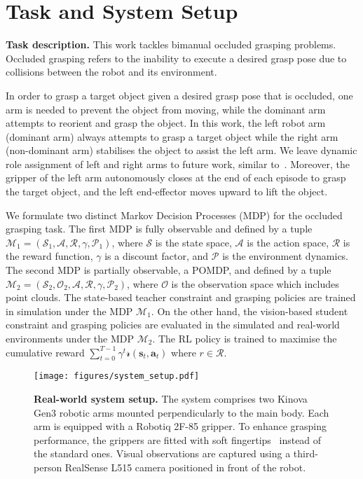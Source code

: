 \section{Task and System Setup}
\textbf{Task description.} 
\label{sec:task_desc}
This work tackles bimanual occluded grasping problems.
Occluded grasping refers to the inability to execute a desired grasp pose due to collisions between the robot and its environment. 


In order to grasp a target object given a desired grasp pose that is occluded, one arm is needed to prevent the object from moving, while the dominant arm attempts to reorient and grasp the object.
In this work, the left robot arm (dominant arm) always attempts to grasp a target object while the right arm (non-dominant arm) stabilises the object to assist the left arm.
We leave dynamic role assignment of left and right arms to future work, similar to~\cite{grannen2023stabilize}.
Moreover, the gripper of the left arm autonomously closes at the end of each episode to grasp the target object, and the left end-effector moves upward to lift the object.

We formulate two distinct Markov Decision Processes (MDP) for the occluded grasping task.
The first MDP is fully observable and defined by a tuple $\mathcal{M}_{1} = (\mathcal{S}_{1}, \mathcal{A}, \mathcal{R}, \gamma, \mathcal{P}_{1})$, where $\mathcal{S}$ is the state space, $\mathcal{A}$ is the action space, $\mathcal{R}$ is the reward function, $\gamma$ is a discount factor, and $\mathcal{P}$ is the environment dynamics.
The second MDP is partially observable, a POMDP, and defined by a tuple $\mathcal{M}_{2} = (\mathcal{S}_{2}, \mathcal{O}_{2}, \mathcal{A}, \mathcal{R}, \gamma, \mathcal{P}_{2})$, where $\mathcal{O}$ is the observation space which includes point clouds.
The state-based teacher constraint and grasping policies are trained in simulation under the MDP $\mathcal{M}_{1}$.
On the other hand, the vision-based student constraint and grasping policies are evaluated in the simulated and real-world environments under the MDP $\mathcal{M}_{2}$.
The RL policy is trained to maximise the cumulative reward $\sum_{t=0}^{T-1}\gamma^{t} \mathcal{r}(\mathbf{s}_{t}, \mathbf{a}_{t})$ where $r \in \mathcal{R}$.

\begin{figure}
    \centering
    \texttt{[image: figures/system\_setup.pdf]}
    \caption{\textbf{Real-world system setup.}  The system comprises two Kinova Gen3 robotic arms mounted perpendicularly to the main body. Each arm is equipped with a Robotiq 2F-85 gripper. To enhance grasping performance, the grippers are fitted with soft fingertips~\cite{chi2024universalmanipulationinterfaceinthewild} instead of the standard ones. Visual observations are captured using a third-person RealSense L515 camera positioned in front of the robot.}
    \label{fig:real-world_sys}
    \vspace{-0.5cm}
\end{figure}


